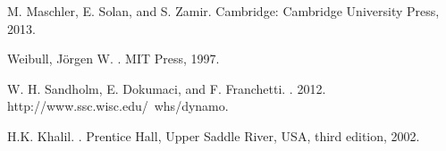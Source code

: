 \documentclass[a4 paper, 12pt]{article}
\begin{document}

\begin{thebibliography}{99}

         M. Maschler, E. Solan, and S. Zamir.  Cambridge: Cambridge University Press, 2013.

         Weibull, Jörgen W. . MIT Press, 1997.

         W. H. Sandholm, E. Dokumaci, and F. Franchetti. . 2012. http://www.ssc.wisc.edu/~whs/dynamo.


         H.K. Khalil. . Prentice Hall, Upper Saddle River, USA, third edition, 2002.

\end{thebibliography}
\end{document}
